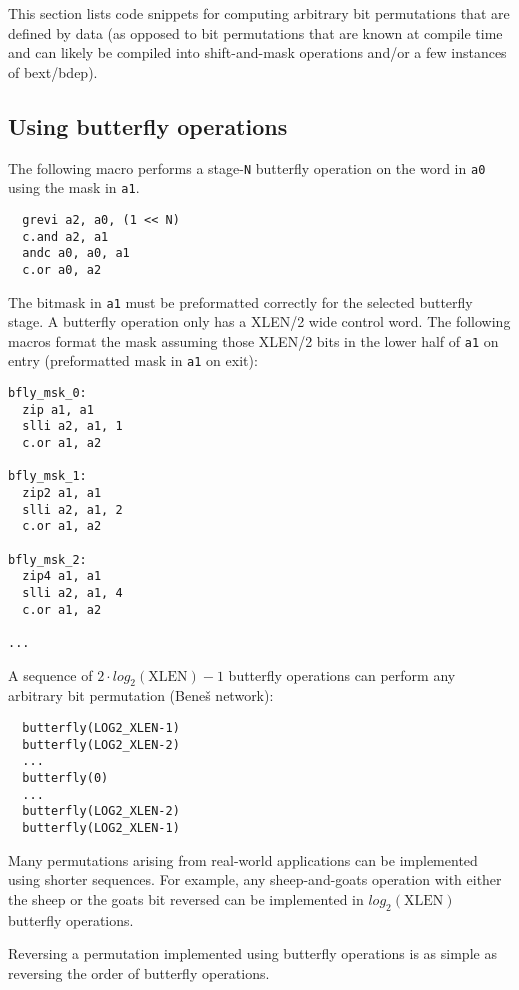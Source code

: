 This section lists code snippets for computing arbitrary bit permutations that
are defined by data (as opposed to bit permutations that are known at compile
time and can likely be compiled into shift-and-mask operations and/or a few
instances of bext/bdep).

\subsection{Using butterfly operations}
\label{butterfly}

The following macro performs a stage-{\tt N} butterfly operation on the word in
{\tt a0} using the mask in {\tt a1}.

\begin{verbatim}
  grevi a2, a0, (1 << N)
  c.and a2, a1
  andc a0, a0, a1
  c.or a0, a2
\end{verbatim}

The bitmask in {\tt a1} must be preformatted correctly for the selected butterfly
stage. A butterfly operation only has a XLEN/2 wide control word. The following
macros format the mask assuming those XLEN/2 bits in the lower half of {\tt a1}
on entry (preformatted mask in {\tt a1} on exit):

\begin{verbatim}
bfly_msk_0:
  zip a1, a1
  slli a2, a1, 1
  c.or a1, a2

bfly_msk_1:
  zip2 a1, a1
  slli a2, a1, 2
  c.or a1, a2

bfly_msk_2:
  zip4 a1, a1
  slli a2, a1, 4
  c.or a1, a2

...
\end{verbatim}

A sequence of $2\cdot{}log_2(\textrm{XLEN})-1$ butterfly operations can perform any
arbitrary bit permutation (Bene{\v s} network):

\begin{verbatim}
  butterfly(LOG2_XLEN-1)
  butterfly(LOG2_XLEN-2)
  ...
  butterfly(0)
  ...
  butterfly(LOG2_XLEN-2)
  butterfly(LOG2_XLEN-1)
\end{verbatim}


Many permutations arising from real-world applications can be implemented
using shorter sequences. For example, any sheep-and-goats operation with either
the sheep or the goats bit reversed can be implemented in $log_2(\textrm{XLEN})$
butterfly operations.

Reversing a permutation implemented using butterfly operations is as simple as
reversing the order of butterfly operations.

